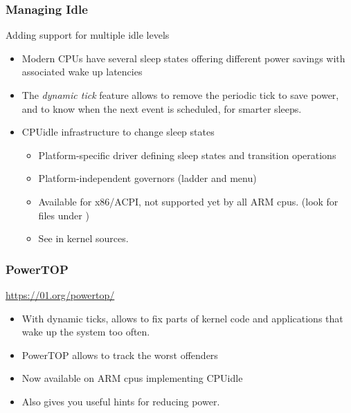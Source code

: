 \begin{frame}
  \frametitle{Managing Idle}
  Adding support for multiple idle levels
  \begin{itemize}
  \item Modern CPUs have several sleep states offering different
    power savings with associated wake up latencies
  \item The {\em dynamic tick} feature allows to remove the
    periodic tick to save power, and to know when the next event is
    scheduled, for smarter sleeps.
  \item CPUidle infrastructure to change sleep states
    \begin{itemize}
    \item Platform-specific driver defining sleep states and
      transition operations
    \item Platform-independent governors (ladder and menu)
    \item Available for x86/ACPI, not supported yet by all ARM cpus.
      (look for  files under )
    \item See  in kernel sources.
    \end{itemize}
  \end{itemize}
\end{frame}

\begin{frame}
  \frametitle{PowerTOP}
  \url{https://01.org/powertop/}
  \begin{itemize}
  \item With dynamic ticks, allows to fix parts of kernel code and
    applications that wake up the system too often.
  \item PowerTOP allows to track the worst offenders
  \item Now available on ARM cpus implementing CPUidle
  \item Also gives you useful hints for reducing power.
  \end{itemize}
\end{frame}

